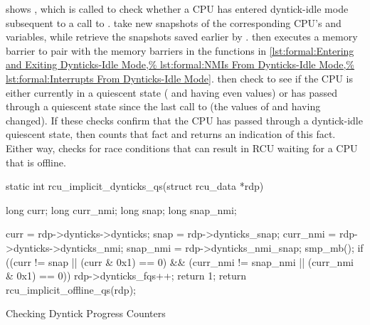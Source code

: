 \begin{fcvref}
shows , which is called to check
whether a CPU has entered dyntick-idle mode subsequent to a call
to .
 take new snapshots of the corresponding CPU's
 and  variables, while
 retrieve the snapshots saved earlier by
.
 then
executes a memory barrier to pair with the memory barriers in
the functions in
\cref{lst:formal:Entering and Exiting Dynticks-Idle Mode,%
lst:formal:NMIs From Dynticks-Idle Mode,%
lst:formal:Interrupts From Dynticks-Idle Mode}.
then check to see if the CPU is either currently in
a quiescent state ( and  having even values) or
has passed through a quiescent state since the last call to
 (the values of
 and  having changed).
If these checks confirm that the CPU has passed through a dyntick-idle
quiescent state, then  counts that fact and
 returns an indication of this fact.
Either way, 
checks for race conditions that can result in RCU
waiting for a CPU that is offline.
\end{fcvref}

\begin{listing}[tbp]
\begin{fcvlabel}
\begin{VerbatimL}[commandchars=\\\[\]]
static int
rcu_implicit_dynticks_qs(struct rcu_data *rdp)
{
	long curr;
	long curr_nmi;
	long snap;
	long snap_nmi;

	curr = rdp->dynticks->dynticks;		\lnlbl[curr]
	snap = rdp->dynticks_snap;		\lnlbl[snap]
	curr_nmi = rdp->dynticks->dynticks_nmi;	\lnlbl[currn]
	snap_nmi = rdp->dynticks_nmi_snap;	\lnlbl[snapn]
	smp_mb();				\lnlbl[mb]
	if ((curr != snap || (curr & 0x1) == 0) && \lnlbl[chk_q:b]
	    (curr_nmi != snap_nmi || (curr_nmi & 0x1) == 0)) { \lnlbl[chk_q:e]
		rdp->dynticks_fqs++;		\lnlbl[cnt]
		return 1;			\lnlbl[ret_1]
	}
	return rcu_implicit_offline_qs(rdp);	
}
\end{VerbatimL}
\end{fcvlabel}
\caption{Checking Dyntick Progress Counters}
\label{lst:formal:Checking Dyntick Progress Counters}
\end{listing}

